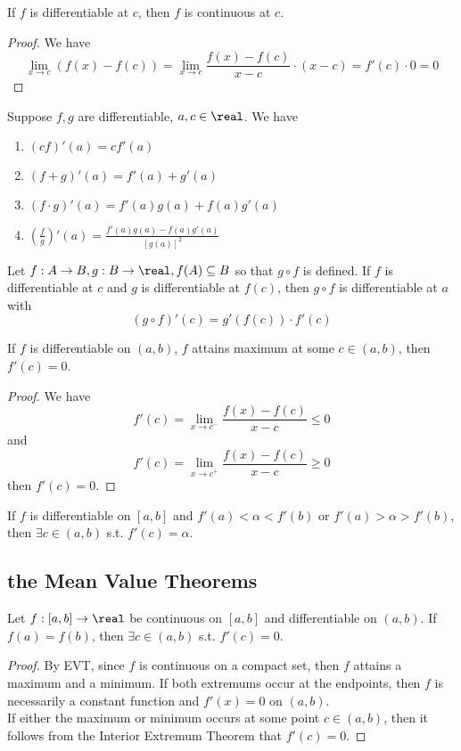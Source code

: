 \documentclass[11pt]{article}
\begin{document}
\property If $f$ is differentiable at $c$, then $f$ is continuous at $c$.
\begin{proof}
	We have
	$$\underset{x \rightarrow c}{\lim} (f(x) - f(c)) = \underset{x \rightarrow c}{\lim} \frac{f(x) - f(c)}{x - c} \cdot (x - c) = f'(c)\cdot 0 = 0$$
\end{proof}

 Suppose $f, g$ are differentiable, $a,c \in \real$. We have
\begin{enumerate}
	\item $(cf)'(a) = cf'(a)$
	\item $(f + g)'(a) = f'(a) + g'(a)$
	\item $(f \cdot g)'(a) = f'(a)g(a) + f(a)g'(a)$
	\item $\left( \frac{f}{g} \right)'(a) = \frac{f'(a)g(a) - f(a)g'(a)}{[g(a)]^2}$
\end{enumerate}

 Let $f: A \rightarrow B, g: B \rightarrow \real, f(A) \subseteq B$ so that $g \circ f$ is defined. If $f$ is differentiable at $c$ and $g$ is differentiable at $f(c)$, then $g \circ f$ is differentiable at $a$ with 
	$$(g \circ f)'(c) = g'(f(c)) \cdot f'(c)$$

 If $f$ is differentiable on $(a,b)$, $f$ attains maximum at some $c \in (a,b)$, then $f'(c) = 0$.
\begin{proof}
	We have
	$$f'(c) = \underset{x \rightarrow c^-}{\lim} \frac{f(x) - f(c)}{x-c} \leq 0$$
	and 
	$$f'(c) = \underset{x \rightarrow c^+}{\lim} \frac{f(x) - f(c)}{x-c} \geq 0$$
	then $f'(c) = 0$.
\end{proof}

 If $f$ is differentiable on $[a,b]$ and $f'(a) < \alpha < f'(b)$ or $f'(a) > \alpha > f'(b)$, then $\exists c \in (a,b)$ s.t. $f'(c) = \alpha$.

\subsection{the Mean Value Theorems}
 Let $f:[a,b] \rightarrow \real$ be continuous on $[a,b]$ and differentiable on $(a,b)$. If $f(a) = f(b)$, then $\exists c\in (a,b)$ s.t. $f'(c) = 0$.
\begin{proof}
	By EVT, since $f$ is continuous on a compact set, then $f$ attains a maximum and a minimum. If both extremums occur at the endpoints, then $f$ is necessarily a constant function and $f'(x) = 0$ on $(a,b)$.\\
	If either the maximum or minimum occurs at some point $c \in (a,b)$, then it follows from the Interior Extremum Theorem that $f'(c) = 0$.
\end{proof}
\end{document}
